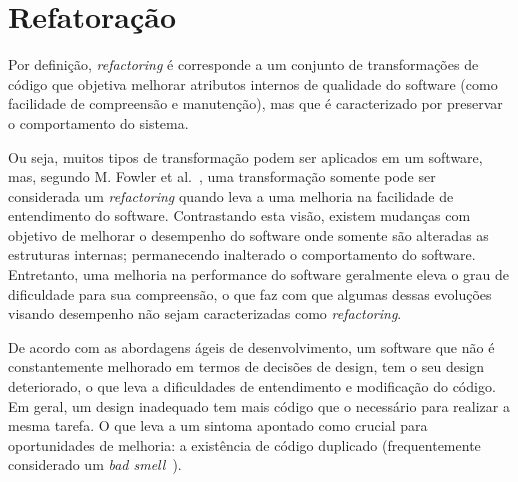 \section{Refatoração}\label{sec:refactoring}

Por defini\c{c}\~{a}o, \textit{refactoring} \'{e} corresponde a 
um conjunto de transforma\c c\~{o}es  
de c\'{o}digo que objetiva melhorar atributos internos de qualidade  
do software (como facilidade de compreens\~{a}o e 
manuten\c c\~{a}o), mas que \'{e} caracterizado por preservar o comportamento do 
sistema. 

Ou seja, muitos tipos de transforma\c c\~{a}o 
podem ser aplicados em um software, mas, segundo M. Fowler et al.~\cite{martinFowlerRafactoring}, 
uma transforma\c c\~{a}o somente pode ser considerada um \textit{refactoring} quando 
leva a uma melhoria na facilidade de entendimento do software. 
Contrastando esta vis\~{a}o, existem mudan\c{c}as com objetivo de melhorar o desempenho do 
software onde somente s\~{a}o alteradas as estruturas internas; permanecendo inalterado o comportamento do software. 
Entretanto, uma melhoria na performance do software geralmente eleva o grau de dificuldade para sua 
compreens\~{a}o, o que faz com que algumas dessas evolu\c{c}\~{o}es visando desempenho n\~{a}o sejam 
caracterizadas como \textit{refactoring}.


De acordo com as abordagens \'{a}geis de 
desenvolvimento, um software que n\~{a}o \'{e} constantemente melhorado em 
termos de decis\~{o}es de design, tem o seu design deteriorado, 
o que leva a dificuldades de entendimento e modifica\c c\~{a}o do c\'{o}digo. 
Em geral, um design inadequado tem mais c\'{o}digo 
que o necess\'{a}rio para realizar a mesma tarefa. O que leva a um sintoma apontado 
como crucial para oportunidades de melhoria: 
a exist\^{e}ncia de código duplicado (frequentemente considerado um 
\emph{bad smell}~\cite{Tufano:2015:WYC:2818754.2818805,martinFowlerRafactoring}). 

